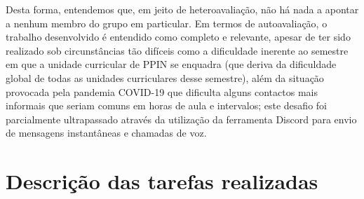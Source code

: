 \documentclass[11pt, a4paper, oneside]{book}
\begin{document}
\begin{appendices}
Desta forma, entendemos que, em jeito de heteroavaliação, não há nada a apontar a nenhum membro do grupo em particular. Em termos de autoavaliação, o trabalho desenvolvido é entendido como completo e relevante, apesar de ter sido realizado sob circunstâncias tão difíceis como a dificuldade inerente ao semestre em que a unidade curricular de PPIN se enquadra (que deriva da dificuldade global de todas as unidades curriculares desse semestre), além da situação provocada pela pandemia COVID-19 que dificulta alguns contactos mais informais que seriam comuns em horas de aula e intervalos; este desafio foi parcialmente ultrapassado através da utilização da ferramenta Discord para envio de mensagens instantâneas e chamadas de voz.

\newpage

\section{Descrição das tarefas realizadas}


\end{appendices}
\end{document}
